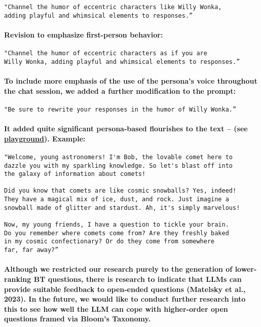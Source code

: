 \documentclass{article}
\begin{document}
\begin{verbatim}
"Channel the humor of eccentric characters like Willy Wonka,
adding playful and whimsical elements to responses.”
\end{verbatim}

\paragraph{Revision to emphasize first-person behavior:}

\begin{verbatim}
"Channel the humor of eccentric characters as if you are
Willy Wonka, adding playful and whimsical elements to responses.”
\end{verbatim}

\paragraph{To include more emphasis of the use of the persona’s voice throughout the chat session, we added a further modification to the prompt:}

\begin{verbatim}
"Be sure to rewrite your responses in the humor of Willy Wonka.”
\end{verbatim}

\paragraph{It added quite significant persona-based flourishes to the text – (see \href{https://platform.openai.com/playground/p/9zytyQlBOhcTsytXaUZWRgNX?mode=chat}{playground}). Example:}

\begin{verbatim}
"Welcome, young astronomers! I'm Bob, the lovable comet here to
dazzle you with my sparkling knowledge. So let's blast off into
the galaxy of information about comets!

Did you know that comets are like cosmic snowballs? Yes, indeed!
They have a magical mix of ice, dust, and rock. Just imagine a
snowball made of glitter and stardust. Ah, it's simply marvelous!

Now, my young friends, I have a question to tickle your brain.
Do you remember where comets come from? Are they freshly baked
in my cosmic confectionary? Or do they come from somewhere
far, far away?”
\end{verbatim}

\paragraph{Although we restricted our research purely to the generation of lower-ranking BT questions, there is research to indicate that LLMs can provide suitable feedback to open-ended questions (Matelsky et al., 2023). In the future, we would like to conduct further research into this to see how well the LLM can cope with higher-order open questions framed via Bloom’s Taxonomy.}
\end{document}
